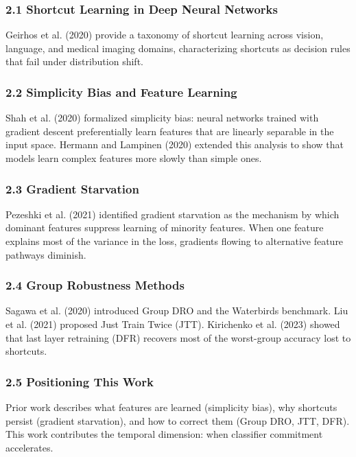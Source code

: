 
\subsubsection{2.1 Shortcut Learning in Deep Neural Networks}

Geirhos et al. (2020) provide a taxonomy of shortcut learning across vision, language, and medical imaging domains, characterizing shortcuts as decision rules that fail under distribution shift.

\subsubsection{2.2 Simplicity Bias and Feature Learning}

Shah et al. (2020) formalized simplicity bias: neural networks trained with gradient descent preferentially learn features that are linearly separable in the input space. Hermann and Lampinen (2020) extended this analysis to show that models learn complex features more slowly than simple ones.

\subsubsection{2.3 Gradient Starvation}

Pezeshki et al. (2021) identified gradient starvation as the mechanism by which dominant features suppress learning of minority features. When one feature explains most of the variance in the loss, gradients flowing to alternative feature pathways diminish.

\subsubsection{2.4 Group Robustness Methods}

Sagawa et al. (2020) introduced Group DRO and the Waterbirds benchmark. Liu et al. (2021) proposed Just Train Twice (JTT). Kirichenko et al. (2023) showed that last layer retraining (DFR) recovers most of the worst-group accuracy lost to shortcuts.

\subsubsection{2.5 Positioning This Work}

Prior work describes what features are learned (simplicity bias), why shortcuts persist (gradient starvation), and how to correct them (Group DRO, JTT, DFR). This work contributes the temporal dimension: when classifier commitment accelerates.

